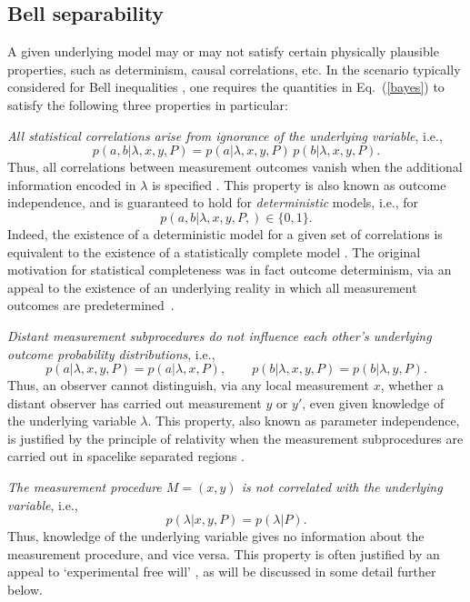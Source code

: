 \documentclass[graybox]{svmult}
\begin{document}
\subsection{Bell separability}
\label{2.2}

A given underlying model may or may not satisfy certain physically plausible properties, such as determinism, causal correlations, etc.  In the scenario typically considered for Bell inequalities \cite{bell}, one requires the quantities in Eq.~(\ref{bayes}) to satisfy the following three properties in particular:

 {\it All statistical correlations arise from ignorance of the underlying variable}, i.e., 
\begin{equation} \label{comp}
p(a,b|\lambda,x,y,P) = p(a|\lambda,x,y,P)\,p(b|\lambda,x,y,P) .
\end{equation}
Thus, all correlations between measurement outcomes vanish when the additional information encoded in $\lambda$ is specified \cite{jarrett}.  This property is also known as outcome independence, and is guaranteed to hold for {\it deterministic} models, i.e., for
\[p(a,b|\lambda,x,y,P,)\in\{0,1\}. \]
 Indeed, the existence of a deterministic model for a given set of correlations is equivalent to the existence of a statistically complete model \cite{relaxed,fine}. The original motivation for statistical completeness  was in fact outcome determinism, via an appeal to the existence of an underlying reality in which all measurement outcomes are predetermined~\cite{bell}.

 {\it Distant measurement subprocedures do not influence each other's underlying outcome probability distributions}, i.e.,
\begin{equation} \label{local}
p(a|\lambda,x,y,P) = p(a|\lambda,x,P),\qquad p(b|\lambda,x,y,P) = p(b|\lambda,y,P) .
\end{equation}
Thus, an observer cannot distinguish, via any local measurement $x$, whether a distant observer has carried out measurement $y$ or $y'$, even given knowledge of the underlying variable $\lambda$.  This property, also known as parameter independence, is justified by the principle of relativity when the measurement subprocedures are carried out in spacelike separated regions \cite{bell}.  

 {\it The measurement procedure $M=(x,y)$ is not correlated with the underlying variable}, i.e., 
\begin{equation} \label{mi}
p(\lambda|x,y,P) = p(\lambda|P).
\end{equation}
Thus, knowledge of the underlying variable gives no information about the measurement procedure, and vice versa.  This property is often justified by an appeal to `experimental free will' \cite{dialectica}, as will be discussed in some detail further below. 
\end{document}
